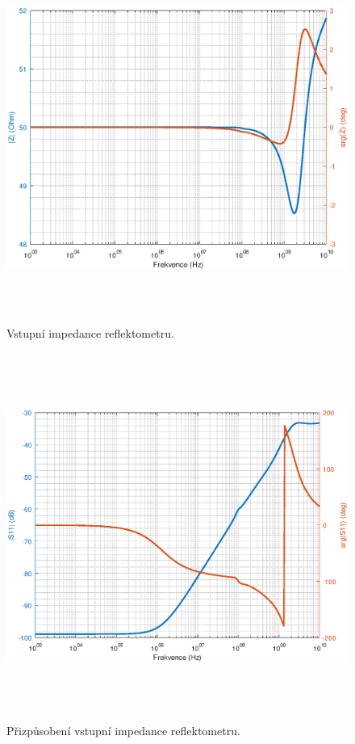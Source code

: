 \begin{figure}[htbp]
\includegraphics[width=\textwidth,height=12cm,keepaspectratio]{images/input_impedance.eps}\caption{Vstupní impedance reflektometru.}\label{input_impedance}
\end{figure}

\begin{figure}[htbp]
\includegraphics[width=\textwidth,height=12cm,keepaspectratio]{images/input_reflection.eps}\caption{Přizpůsobení vstupní impedance reflektometru.}\label{input_reflection}
\end{figure}


